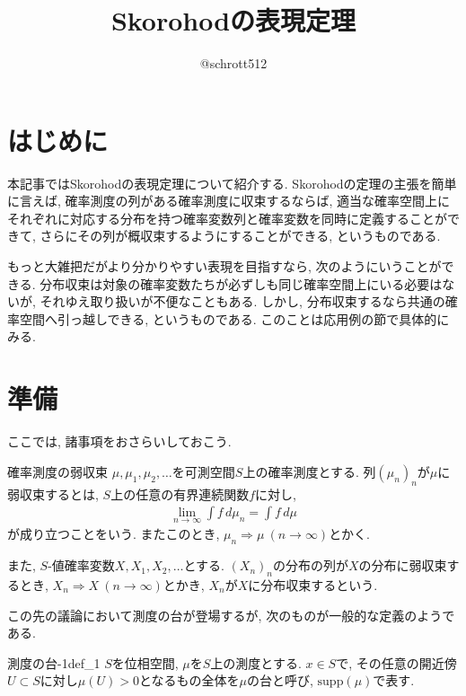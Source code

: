 

\title{Skorohodの表現定理}
\author{@schrott512}
\date{}



\maketitle

\section{はじめに}
本記事ではSkorohodの表現定理について紹介する.
Skorohodの定理の主張を簡単に言えば, 確率測度の列がある確率測度に収束するならば, 適当な確率空間上にそれぞれに対応する分布を持つ確率変数列と確率変数を同時に定義することができて, さらにその列が概収束するようにすることができる, というものである.

もっと大雑把だがより分かりやすい表現を目指すなら, 次のようにいうことができる.
分布収束は対象の確率変数たちが必ずしも同じ確率空間上にいる必要はないが, それゆえ取り扱いが不便なこともある.
しかし, 分布収束するなら共通の確率空間へ引っ越しできる, というものである.
このことは応用例の節で具体的にみる.

\section{準備}
ここでは, 諸事項をおさらいしておこう.

\begin{definition}{確率測度の弱収束}{}
    $\mu,\mu_1,\mu_2,\dots$を可測空間$S$上の確率測度とする.
    列$(\mu_n)_n$が$\mu$に弱収束するとは, $S$上の任意の有界連続関数$f$に対し,
    \begin{align*}
        \lim_{n\to\infty}\int f \,d\mu_n=\int f \,d\mu
    \end{align*}
    が成り立つことをいう.
    またこのとき, $\mu_n\Rightarrow \mu~(n\to\infty)$とかく.

    また, $S$-値確率変数$X,X_1,X_2,\dots$とする.
    $(X_n)_n$の分布の列が$X$の分布に弱収束するとき, $X_n\Rightarrow X~(n\to\infty)$とかき, $X_n$が$X$に分布収束するという.
\end{definition}

この先の議論において測度の台が登場するが, 次のものが一般的な定義のようである.

\begin{definition}{測度の台-1}{def_1}
    $S$を位相空間, $\mu$を$S$上の測度とする.
    $x\in S$で, その任意の開近傍$U\subset S$に対し$\mu(U)>0$となるもの全体を$\mu$の台と呼び, $\textrm{supp}(\mu)$で表す.
\end{definition}

